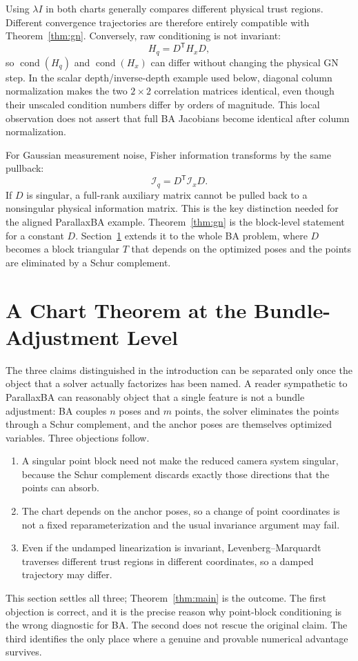 \documentclass[11pt,a4paper]{article}
\theoremstyle{definition}
\theoremstyle{remark}
\DeclareMathOperator{\cond}{cond}
\newcommand{\T}{\mathsf{T}}
\begin{document}
Using $\lambda I$ in both charts generally compares different physical trust regions. Different convergence trajectories are therefore entirely compatible with Theorem~\ref{thm:gn}. Conversely, raw conditioning is not invariant:
\begin{equation}
  H_q=D^\T H_xD,
\end{equation}
so $\cond(H_q)$ and $\cond(H_x)$ can differ without changing the physical GN step. In the scalar depth/inverse-depth example used below, diagonal column normalization makes the two $2\times2$ correlation matrices identical, even though their unscaled condition numbers differ by orders of magnitude. This local observation does not assert that full BA Jacobians become identical after column normalization.

For Gaussian measurement noise, Fisher information transforms by the same pullback:
\begin{equation}
  \mathcal I_q=D^\T\mathcal I_xD.
  \label{eq:fisher}
\end{equation}
If $D$ is singular, a full-rank auxiliary matrix cannot be pulled back to a nonsingular physical information matrix. This is the key distinction needed for the aligned ParallaxBA example. Theorem~\ref{thm:gn} is the block-level statement for a constant $D$. Section~\ref{sec:ba-theorem} extends it to the whole BA problem, where $D$ becomes a block triangular $T$ that depends on the optimized poses and the points are eliminated by a Schur complement.

\section{A Chart Theorem at the Bundle-Adjustment Level}
\label{sec:ba-theorem}

The three claims distinguished in the introduction can be separated only once the object that a solver actually factorizes has been named. A reader sympathetic to ParallaxBA can reasonably object that a single feature is not a bundle adjustment: BA couples $n$ poses and $m$ points, the solver eliminates the points through a Schur complement, and the anchor poses are themselves optimized variables. Three objections follow.
\begin{enumerate}[leftmargin=2em]
  \item A singular point block need not make the reduced camera system singular, because the Schur complement discards exactly those directions that the points can absorb.
  \item The chart depends on the anchor poses, so a change of point coordinates is not a fixed reparameterization and the usual invariance argument may fail.
  \item Even if the undamped linearization is invariant, Levenberg--Marquardt traverses different trust regions in different coordinates, so a damped trajectory may differ.
\end{enumerate}
This section settles all three; Theorem~\ref{thm:main} is the outcome. The first objection is correct, and it is the precise reason why point-block conditioning is the wrong diagnostic for BA. The second does not rescue the original claim. The third identifies the only place where a genuine and provable numerical advantage survives.
\end{document}
